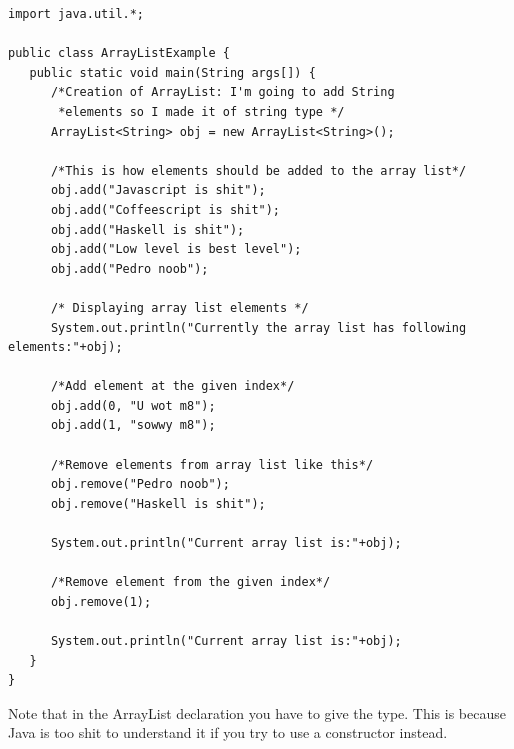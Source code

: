 \documentclass{article}
\begin{document}
\begin{lstlisting}
import java.util.*;

public class ArrayListExample {
   public static void main(String args[]) {
      /*Creation of ArrayList: I'm going to add String
       *elements so I made it of string type */
	  ArrayList<String> obj = new ArrayList<String>();

	  /*This is how elements should be added to the array list*/
	  obj.add("Javascript is shit");
	  obj.add("Coffeescript is shit");
	  obj.add("Haskell is shit");
	  obj.add("Low level is best level");
	  obj.add("Pedro noob");

	  /* Displaying array list elements */
	  System.out.println("Currently the array list has following elements:"+obj);

	  /*Add element at the given index*/
	  obj.add(0, "U wot m8");
	  obj.add(1, "sowwy m8");

	  /*Remove elements from array list like this*/
	  obj.remove("Pedro noob");
	  obj.remove("Haskell is shit");

	  System.out.println("Current array list is:"+obj);

	  /*Remove element from the given index*/
	  obj.remove(1);

	  System.out.println("Current array list is:"+obj);
   }
}
\end{lstlisting}

Note that in the ArrayList declaration you have to give the type. This is because Java is too shit to understand it if you try to use a constructor instead.
\end{document}

